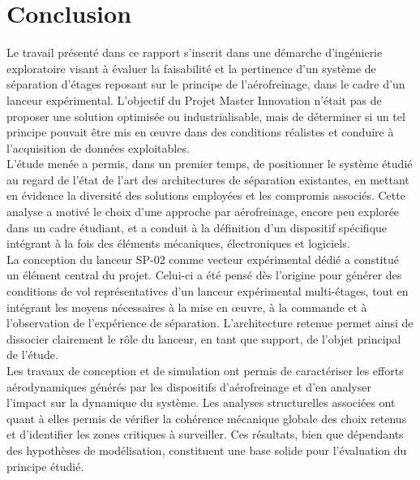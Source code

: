 \section*{Conclusion}
\label{sec:conclusion}

Le travail présenté dans ce rapport s’inscrit dans une démarche d’ingénierie exploratoire visant à évaluer la faisabilité et la
pertinence d’un système de séparation d’étages reposant sur le principe de l’aérofreinage, dans le cadre d’un lanceur
expérimental. L’objectif du Projet Master Innovation n’était pas de proposer une solution optimisée ou industrialisable, mais de
déterminer si un tel principe pouvait être mis en œuvre dans des conditions réalistes et conduire à l’acquisition de données
exploitables.\\

L’étude menée a permis, dans un premier temps, de positionner le système étudié au regard de l’état de l’art des architectures de
séparation existantes, en mettant en évidence la diversité des solutions employées et les compromis associés. Cette analyse a
motivé le choix d’une approche par aérofreinage, encore peu explorée dans un cadre étudiant, et a conduit à la définition d’un
dispositif spécifique intégrant à la fois des éléments mécaniques, électroniques et logiciels.\\

La conception du lanceur SP-02 comme vecteur expérimental dédié a constitué un élément central du projet. Celui-ci a été pensé
dès l’origine pour générer des conditions de vol représentatives d’un lanceur expérimental multi-étages, tout en intégrant les
moyens nécessaires à la mise en œuvre, à la commande et à l’observation de l’expérience de séparation. L’architecture retenue
permet ainsi de dissocier clairement le rôle du lanceur, en tant que support, de l’objet principal de l’étude.\\

Les travaux de conception et de simulation ont permis de caractériser les efforts aérodynamiques générés par les dispositifs
d’aérofreinage et d’en analyser l’impact sur la dynamique du système. Les analyses structurelles associées ont quant à elles
permis de vérifier la cohérence mécanique globale des choix retenus et d’identifier les zones critiques à surveiller. Ces
résultats, bien que dépendants des hypothèses de modélisation, constituent une base solide pour l’évaluation du principe étudié.\\

